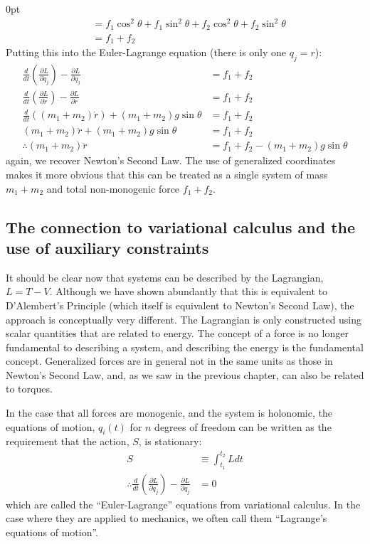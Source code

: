 \begin{example}{0pt}
\begin{align*}
&=f_1\cos^2{\theta}+f_1\sin^2{\theta}+f_2\cos^2{\theta}+f_2\sin^2{\theta}\nonumber\\
&=f_1+f_2
\end{align*}
Putting this into the Euler-Lagrange equation (there is only one $q_j=r$):
\begin{align*}
\frac{d}{dt}\left(\frac{\partial L}{\partial \dot{q}_j} \right) - \frac{\partial L}{\partial q_j}&=f_1+f_2\nonumber\\
\frac{d}{dt}\left(\frac{\partial L}{\partial \dot{r}} \right) - \frac{\partial L}{\partial r}&=f_1+f_2\nonumber\\
\frac{d}{dt}((m_1+m_2)\dot{r})+(m_1+m_2)g\sin{\theta}&=f_1+f_2\nonumber\\
(m_1+m_2)\ddot{r}+(m_1+m_2)g\sin{\theta}&=f_1+f_2\nonumber\\
\therefore (m_1+m_2)\ddot{r}&=f_1+f_2-(m_1+m_2)g\sin{\theta}
\end{align*}
again, we recover Newton's Second Law. The use of generalized coordinates makes it more obvious that this can be treated as a single system of mass $m_1+m_2$ and total non-monogenic force $f_1+f_2$.
\end{example} 

\subsection{The connection to variational calculus and the use of auxiliary constraints}
It should be clear now that systems can be described by the Lagrangian, $L=T-V$. Although we have shown abundantly that this is equivalent to D'Alembert's Principle (which itself is equivalent to Newton's Second Law), the approach is conceptually very different. The Lagrangian is only constructed using scalar quantities that are related to energy. The concept of a force is no longer fundamental to describing a system, and describing the energy is the fundamental concept. Generalized forces are in general not in the same units as those in Newton's Second Law, and, as we saw in the previous chapter, can also be related to torques. 

In the case that all forces are monogenic, and the system is holonomic, the equations of motion, $q_i(t)$ for $n$ degrees of freedom can be written as the requirement that the action, $S$, is stationary:
\begin{align}
S&\equiv\int_{t_1}^{t_2}Ldt\nonumber\\
\therefore \frac{d}{dt}\left(\frac{\partial L}{\partial \dot{q}_j} \right) - \frac{\partial L}{\partial q_j}&=0
\end{align}
which are called the ``Euler-Lagrange'' equations from variational calculus. In the case where they are applied to mechanics, we often call them ``Lagrange's equations of motion''.

